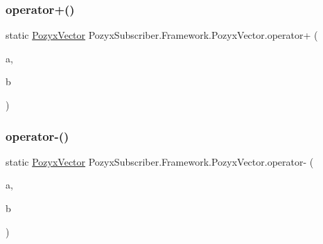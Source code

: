 \subsubsection{\texorpdfstring{operator+()}{operator+()}}
{\footnotesize\ttfamily static \hyperlink{struct_pozyx_subscriber_1_1_framework_1_1_pozyx_vector}{Pozyx\+Vector} Pozyx\+Subscriber.\+Framework.\+Pozyx\+Vector.\+operator+ (\begin{DoxyParamCaption}\item[{\hyperlink{struct_pozyx_subscriber_1_1_framework_1_1_pozyx_vector}{Pozyx\+Vector}}]{a,  }\item[{\hyperlink{struct_pozyx_subscriber_1_1_framework_1_1_pozyx_vector}{Pozyx\+Vector}}]{b }\end{DoxyParamCaption})\hspace{0.3cm}{\ttfamily [static]}}

\mbox{\label{struct_pozyx_subscriber_1_1_framework_1_1_pozyx_vector_ae607f892a7eab44b2385884df61f6699}} 
\subsubsection{\texorpdfstring{operator-\/()}{operator-()}}
{\footnotesize\ttfamily static \hyperlink{struct_pozyx_subscriber_1_1_framework_1_1_pozyx_vector}{Pozyx\+Vector} Pozyx\+Subscriber.\+Framework.\+Pozyx\+Vector.\+operator-\/ (\begin{DoxyParamCaption}\item[{\hyperlink{struct_pozyx_subscriber_1_1_framework_1_1_pozyx_vector}{Pozyx\+Vector}}]{a,  }\item[{\hyperlink{struct_pozyx_subscriber_1_1_framework_1_1_pozyx_vector}{Pozyx\+Vector}}]{b }\end{DoxyParamCaption})\hspace{0.3cm}{\ttfamily [static]}}

\mbox{\label{struct_pozyx_subscriber_1_1_framework_1_1_pozyx_vector_a8319e66719bd50e33a1742a846b2947e}} 
